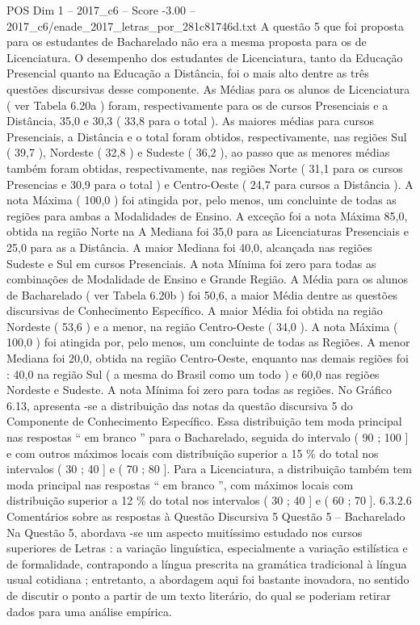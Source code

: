\begin{textsample}{POS Dim 1 – 2017\_c6 – Score -3.00 – 2017\_c6/enade\_2017\_letras\_por\_281c81746d.txt}
A questão 5 que foi proposta para os estudantes de Bacharelado não era a mesma proposta para os de Licenciatura.
O desempenho dos estudantes de Licenciatura, tanto da Educação Presencial quanto na Educação a Distância, foi o mais alto dentre as três questões discursivas desse componente.
As Médias para os alunos de Licenciatura ( ver Tabela 6.20a ) foram, respectivamente para os de cursos Presenciais e a Distância, 35,0 e 30,3 ( 33,8 para o total ).
As maiores médias para cursos Presenciais, a Distância e o total foram obtidos, respectivamente, nas regiões Sul ( 39,7 ), Nordeste ( 32,8 ) e Sudeste ( 36,2 ), ao passo que as menores médias também foram obtidas, respectivamente, nas regiões Norte ( 31,1 para os cursos Presencias e 30,9 para o total ) e Centro-Oeste ( 24,7 para cursos a Distância ).
A nota Máxima ( 100,0 ) foi atingida por, pelo menos, um concluinte de todas as regiões para ambas a Modalidades de Ensino.
A exceção foi a nota Máxima 85,0, obtida na região Norte na A Mediana foi 35,0 para as Licenciaturas Presenciais e 25,0 para as a Distância.
A maior Mediana foi 40,0, alcançada nas regiões Sudeste e Sul em cursos Presenciais.
A nota Mínima foi zero para todas as combinações de Modalidade de Ensino e Grande Região.
A Média para os alunos de Bacharelado ( ver Tabela 6.20b ) foi 50,6, a maior Média dentre as questões discursivas de Conhecimento Específico.
A maior Média foi obtida na região Nordeste ( 53,6 ) e a menor, na região Centro-Oeste ( 34,0 ).
A nota Máxima ( 100,0 ) foi atingida por, pelo menos, um concluinte de todas as Regiões.
A menor Mediana foi 20,0, obtida na região Centro-Oeste, enquanto nas demais regiões foi : 40,0 na região Sul ( a mesma do Brasil como um todo ) e 60,0 nas regiões Nordeste e Sudeste.
A nota Mínima foi zero para todas as regiões.
No Gráfico 6.13, apresenta -se a distribuição das notas da questão discursiva 5 do Componente de Conhecimento Específico.
Essa distribuição tem moda principal nas respostas “ em branco ” para o Bacharelado, seguida do intervalo ( 90 ; 100 ] e com outros máximos locais com distribuição superior a 15 \% do total nos intervalos ( 30 ; 40 ] e ( 70 ; 80 ].
Para a Licenciatura, a distribuição também tem moda principal nas respostas “ em branco ”, com máximos locais com distribuição superior a 12 \% do total nos intervalos ( 30 ; 40 ] e ( 60 ; 70 ]. 6.3.2.6 Comentários sobre as respostas à Questão Discursiva 5 Questão 5 – Bacharelado Na Questão 5, abordava -se um aspecto muitíssimo estudado nos cursos superiores de Letras : a variação linguística, especialmente a variação estilística e de formalidade, contrapondo a língua prescrita na gramática tradicional à língua usual cotidiana ; entretanto, a abordagem aqui foi bastante inovadora, no sentido de discutir o ponto a partir de um texto literário, do qual se poderiam retirar dados para uma análise empírica.

\end{textsample}
